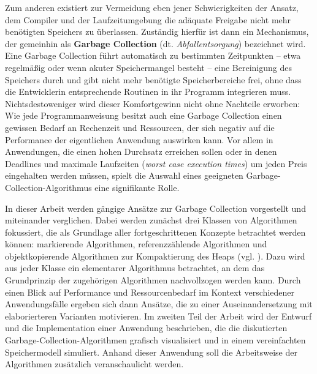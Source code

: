 Zum anderen existiert zur Vermeidung eben jener Schwierigkeiten der Ansatz, dem Compiler und der Laufzeitumgebung die adäquate Freigabe nicht mehr benötigten Speichers zu überlassen.
Zuständig hierfür ist dann ein Mechanismus, der gemeinhin als \textbf{Garbage Collection} (dt. \textit{Abfallentsorgung}) bezeichnet wird.
Eine Garbage Collection führt automatisch zu bestimmten Zeitpunkten -- etwa regelmäßig oder wenn akuter Speichermangel besteht -- eine Bereinigung des Speichers durch und gibt nicht mehr benötigte Speicherbereiche frei, ohne dass die Entwicklerin entsprechende Routinen in ihr Programm integrieren muss.
Nichtsdestoweniger wird dieser Komfortgewinn nicht ohne Nachteile erworben:
Wie jede Programmanweisung besitzt auch eine Garbage Collection einen gewissen Bedarf an Rechenzeit und Ressourcen, der sich negativ auf die Performance der eigentlichen Anwendung auswirken kann.
Vor allem in Anwendungen, die einen hohen Durchsatz erreichen sollen oder in denen Deadlines und maximale Laufzeiten (\textit{worst case execution times}) um jeden Preis eingehalten werden müssen, spielt die Auswahl eines geeigneten Garbage-Collection-Algorithmus eine signifikante Rolle.

In dieser Arbeit werden gängige Ansätze zur Garbage Collection vorgestellt und miteinander verglichen.
Dabei werden zunächst drei Klassen von Algorithmen fokussiert, die als Grundlage aller fortgeschrittenen Konzepte betrachtet werden können: markierende Algorithmen, referenzzählende Algorithmen und objektkopierende Algorithmen zur Kompaktierung des Heaps (vgl. \cite[S. 25]{blackburn2004}).
Dazu wird aus jeder Klasse ein elementarer Algorithmus betrachtet, an dem das Grundprinzip der zugehörigen Algorithmen nachvollzogen werden kann.
Durch einen Blick auf Performance und Ressourcenbedarf im Kontext verschiedener Anwendungsfälle ergeben sich dann Ansätze, die zu einer Auseinandersetzung mit elaborierteren Varianten motivieren.
Im zweiten Teil der Arbeit wird der Entwurf und die Implementation einer Anwendung beschrieben, die die diskutierten Garbage-Collection-Algorithmen grafisch visualisiert und in einem vereinfachten Speichermodell simuliert.
Anhand dieser Anwendung soll die Arbeitsweise der Algorithmen zusätzlich veranschaulicht werden.



